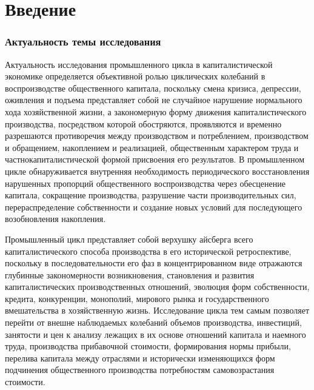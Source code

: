 \chapter*{Введение}                         %

\subsection*{Актуальность темы исследования}
Актуальность исследования промышленного цикла в капиталистической экономике определяется объективной ролью циклических колебаний в воспроизводстве общественного капитала, поскольку смена кризиса, депрессии, оживления и подъема представляет собой не случайное нарушение нормального хода хозяйственной жизни, а закономерную форму движения капиталистического производства, посредством которой обостряются, проявляются и временно разрешаются противоречия между производством и потреблением, производством и обращением, накоплением и реализацией, общественным характером труда и частнокапиталистической формой присвоения его результатов. В промышленном цикле обнаруживается внутренняя необходимость периодического восстановления нарушенных пропорций общественного воспроизводства через обесценение капитала, сокращение производства, разрушение части производительных сил, перераспределение собственности и создание новых условий для последующего возобновления накопления.

Промышленный цикл представляет собой верхушку айсберга всего капиталистического способа производства в его исторической ретроспективе, поскольку в последовательности его фаз в концентрированном виде отражаются глубинные закономерности возникновения, становления и развития капиталистических производственных отношений, эволюция форм собственности, кредита, конкуренции, монополий, мирового рынка и государственного вмешательства в хозяйственную жизнь. Исследование цикла тем самым позволяет перейти от внешне наблюдаемых колебаний объемов производства, инвестиций, занятости и цен к анализу лежащих в их основе отношений капитала и наемного труда, производства прибавочной стоимости, формирования нормы прибыли, перелива капитала между отраслями и исторически изменяющихся форм подчинения общественного производства потребностям самовозрастания стоимости.

